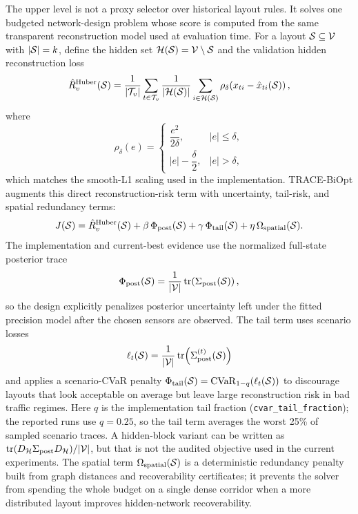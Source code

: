 The upper level is not a proxy selector over historical layout rules. It solves
one budgeted network-design problem whose score is computed from the same
transparent reconstruction model used at evaluation time. For a layout
$\mathcal{S}\subseteq\mathcal{V}$ with $|\mathcal{S}|=k$, define the hidden set
$\mathcal{H}(\mathcal{S})=\mathcal{V}\setminus\mathcal{S}$ and the validation hidden reconstruction loss
\[
    \hat{R}^{\mathrm{Huber}}_v(\mathcal{S})
    =
    \frac{1}{|\mathcal{T}_v|}
    \sum_{t\in\mathcal{T}_v}
    \frac{1}{|\mathcal{H}(\mathcal{S})|}
    \sum_{i\in\mathcal{H}(\mathcal{S})}
    \rho_{\delta}\!\left(x_{ti}-\hat{x}_{ti}(\mathcal{S})\right),
\]
where
\[
    \rho_{\delta}(e)
    =
    \begin{cases}
        \dfrac{e^2}{2\delta}, & |e|\le \delta,\\[4pt]
        |e|-\dfrac{\delta}{2}, & |e|>\delta,
    \end{cases}
\]
which matches the smooth-L1 scaling used in the implementation. TRACE-BiOpt augments this direct
reconstruction-risk term with uncertainty, tail-risk, and spatial redundancy
terms:
\[
    J(\mathcal{S})
    =
    \hat{R}^{\mathrm{Huber}}_v(\mathcal{S})
    +\beta\,\Phi_{\mathrm{post}}(\mathcal{S})
    +\gamma\,\Phi_{\mathrm{tail}}(\mathcal{S})
    +\eta\,\Omega_{\mathrm{spatial}}(\mathcal{S}).
\]
The implementation and current-best evidence use the normalized full-state
posterior trace
\[
    \Phi_{\mathrm{post}}(\mathcal{S})
    =
    \frac{1}{|\mathcal{V}|}\operatorname{tr}\!\left(\Sigma_{\mathrm{post}}(\mathcal{S})\right),
\]
so the design explicitly penalizes posterior uncertainty left under the fitted
precision model after the chosen sensors are observed. The tail term uses
scenario losses
\[
    \ell_t(\mathcal{S})
    =
    \frac{1}{|\mathcal{V}|}\operatorname{tr}\!\left(\Sigma^{(t)}_{\mathrm{post}}(\mathcal{S})\right)
\]
and applies a scenario-CVaR penalty
$\Phi_{\mathrm{tail}}(\mathcal{S})=\mathrm{CVaR}_{1-q}(\ell_t(\mathcal{S}))$ to discourage
layouts that look acceptable on average but leave large reconstruction risk in
bad traffic regimes. Here $q$ is the implementation tail fraction
(\texttt{cvar\_tail\_fraction}); the reported runs use $q=0.25$, so the tail
term averages the worst 25\% of sampled scenario traces. A hidden-block
variant can be written as $\operatorname{tr}(D_{\mathcal{H}}\Sigma_{\mathrm{post}}D_{\mathcal{H}})/|\mathcal{V}|$,
but that is not the audited objective used in the current experiments. The spatial term $\Omega_{\mathrm{spatial}}(\mathcal{S})$ is a
deterministic redundancy penalty built from graph distances and recoverability
certificates; it prevents the solver from spending the whole budget on a
single dense corridor when a more distributed layout improves hidden-network
recoverability.

